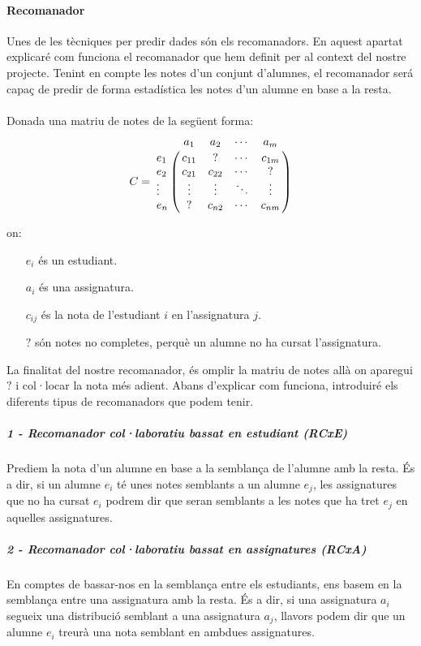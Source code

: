 \documentclass[12pt,a4paper,catalan]{article}
\begin{document}
\paragraph{Recomanador}
Unes de les tècniques per predir dades són els recomanadors. En aquest apartat explicaré com funciona el recomanador que hem definit per al context del nostre projecte. Tenint en compte les notes d'un conjunt d'alumnes, el recomanador será capaç de predir de forma estadística les notes d'un alumne en base a la resta.
\\
\\
Donada una matriu de notes de la següent forma:
$$
C = \bordermatrix{~ &         a_1   &    a_2   &   \cdots    &    a_m  \cr
                  e_1    &  c_{11}  &     ?    &   \cdots    &  c_{1m} \cr
                  e_2    &  c_{21}  &  c_{22}  &   \cdots    &    ?    \cr
                  \vdots &  \vdots  &  \vdots  &   \ddots    &  \vdots \cr
                  e_n    &    ?     &  c_{n2}  &   \cdots    &  c_{nm} \cr
                  }
$$

on:
\begin{itemize}[leftmargin=.5in]
	\item [$e_i$] és un estudiant.
	\item [$a_i$] és una assignatura.
	\item [$c_{ij}$] és la nota de l'estudiant $i$ en l'assignatura $j$.
	\item [$?$] són notes no completes, perquè un alumne no ha cursat l'assignatura.
\end{itemize}

La finalitat del nostre recomanador, és omplir la matriu de notes allà on aparegui $?$ i col·locar la nota més adient. Abans d'explicar com funciona, introduiré els diferents tipus de recomanadors que podem tenir.

\subparagraph{1 - Recomanador col·laboratiu bassat en estudiant (RCxE)}
Prediem la nota d'un alumne en base a la semblança de l'alumne amb la resta. És a dir, si un alumne $e_i$ té unes notes semblants a un alumne $e_j$, les assignatures que no ha cursat $e_i$ podrem dir que seran semblants a les notes que ha tret $e_j$ en aquelles assignatures.

\subparagraph{2 - Recomanador col·laboratiu bassat en assignatures (RCxA)}
En comptes de bassar-nos en la semblança entre els estudiants, ens basem en la semblança entre una assignatura amb la resta. És a dir, si una assignatura $a_i$ segueix una distribució semblant a una assignatura $a_j$, llavors podem dir que un alumne $e_i$ treurà una nota semblant en ambdues assignatures.
\end{document}
